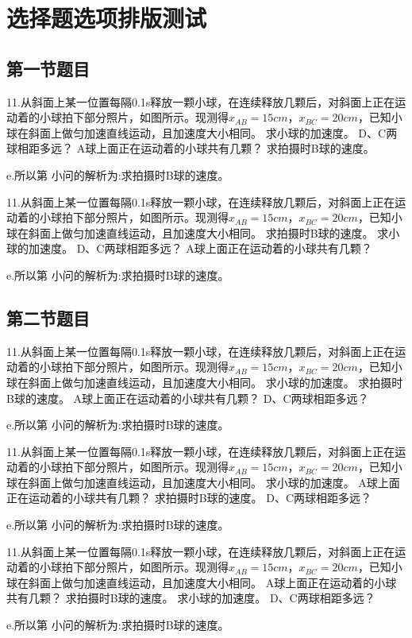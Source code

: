 \documentclass[a4paper,fontset = windows]{ctexbook}
\begin{document}
\chapter{选择题选项排版测试}

\section{第一节题目}
 \begin{calculations}
    11.从斜面上某一位置每隔0.1s释放一颗小球，在连续释放几颗后，对斜面上正在运
    动着的小球拍下部分照片，如图所示。现测得$x_{AB}=15cm$，$x_{BC}=20cm$，已知小球在斜面上做匀加速直线运动，且加速度大小相同。
    \qitem[1] 求小球的加速度。
    \qitem[3] D、C两球相距多远？
    \qitem[4] A球上面正在运动着的小球共有几颗？
    \qitem[2] 求拍摄时B球的速度。

    e.所以第  小问的解析为:求拍摄时B球的速度。

    11.从斜面上某一位置每隔0.1s释放一颗小球，在连续释放几颗后，对斜面上正在运
    动着的小球拍下部分照片，如图所示。现测得$x_{AB}=15cm$，$x_{BC}=20cm$，已知小球在斜面上做匀加速直线运动，且加速度大小相同。
    \qitem[2] 求拍摄时B球的速度。
    \qitem[1] 求小球的加速度。
    \qitem[3] D、C两球相距多远？
    \qitem[4] A球上面正在运动着的小球共有几颗？

    e.所以第  小问的解析为:求拍摄时B球的速度。

 \end{calculations}

\section{第二节题目}
 \begin{calculations}
    11.从斜面上某一位置每隔0.1s释放一颗小球，在连续释放几颗后，对斜面上正在运
    动着的小球拍下部分照片，如图所示。现测得$x_{AB}=15cm$，$x_{BC}=20cm$，已知小球在斜面上做匀加速直线运动，且加速度大小相同。
    \qitem[1] 求小球的加速度。
    \qitem[2] 求拍摄时B球的速度。
    \qitem[4] A球上面正在运动着的小球共有几颗？
    \qitem[3] D、C两球相距多远？

    e.所以第  小问的解析为:求拍摄时B球的速度。

    11.从斜面上某一位置每隔0.1s释放一颗小球，在连续释放几颗后，对斜面上正在运
    动着的小球拍下部分照片，如图所示。现测得$x_{AB}=15cm$，$x_{BC}=20cm$，已知小球在斜面上做匀加速直线运动，且加速度大小相同。
    \qitem[1] 求小球的加速度。
    \qitem[4] A球上面正在运动着的小球共有几颗？
    \qitem[2] 求拍摄时B球的速度。
    \qitem[3] D、C两球相距多远？

    e.所以第  小问的解析为:求拍摄时B球的速度。

    11.从斜面上某一位置每隔0.1s释放一颗小球，在连续释放几颗后，对斜面上正在运
    动着的小球拍下部分照片，如图所示。现测得$x_{AB}=15cm$，$x_{BC}=20cm$，已知小球在斜面上做匀加速直线运动，且加速度大小相同。
    \qitem A球上面正在运动着的小球共有几颗？
    \qitem 求拍摄时B球的速度。
    \qitem 求小球的加速度。
    \qitem D、C两球相距多远？

    e.所以第  小问的解析为:求拍摄时B球的速度。

 \end{calculations}


 
\end{document}

